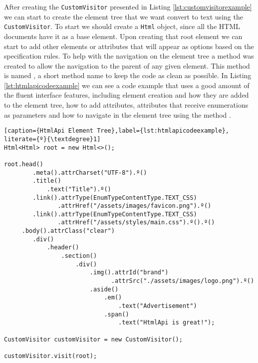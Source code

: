 \noindent
After creating the \texttt{CustomVisitor} presented in Listing \ref{lst:customvisitorexample} we can start to create the element tree that we want convert to text using the \texttt{CustomVisitor}. To start we should create a \texttt{Html} object, since all the \ac{HTML} documents have it as a base element. Upon creating that root element we can start to add other elements or attributes that will appear as options based on the specification rules. To help with the navigation on the element tree a method was created to allow the navigation to the parent of any given element. This method is named \texttt{\textdegree}, a short method name to keep the code as clean as possible. In Listing \ref{lst:htmlapicodeexample} we can see a code example that uses a good amount of the fluent interface features, including element creation and how they are added to the element tree, how to add attributes, attributes that receive enumerations as parameters and how to navigate in the element tree using the method \texttt{\textdegree}.

\bigskip


\begin{minipage}{\linewidth}
\begin{lstlisting}[caption={HtmlApi Element Tree},label={lst:htmlapicodeexample}, literate={º}{\textdegree}1]
Html<Html> root = new Html<>();

root.head()
        .meta().attrCharset("UTF-8").º()
        .title()
            .text("Title").º()
        .link().attrType(EnumTypeContentType.TEXT_CSS)
               .attrHref("/assets/images/favicon.png").º()
        .link().attrType(EnumTypeContentType.TEXT_CSS)
               .attrHref("/assets/styles/main.css").º().º()
     .body().attrClass("clear")
        .div()
            .header()
                .section()
                    .div()
                        .img().attrId("brand")
                              .attrSrc("./assets/images/logo.png").º()
                        .aside()
                            .em()
                                .text("Advertisement")
                            .span()
                                .text("HtmlApi is great!");
                                    
CustomVisitor customVisitor = new CustomVisitor();
    
customVisitor.visit(root);
\end{lstlisting}
\end{minipage}

